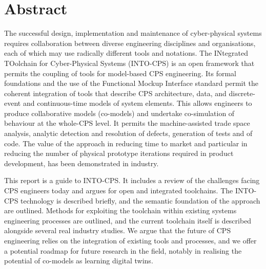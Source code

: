 \documentclass[a4paper,12pt,final]{include/intocpsassociation}   %
\newenvironment{assumption}{\noindent\smallskip\color{blue}\begin{framed}\begin{minipage}{0.95\columnwidth}}{\end{minipage}\end{framed}\smallskip\par}
\begin{document}
\maketitle
%
%
%
\section*{Abstract}
\label{sec:abstract}
%
The successful design, implementation and maintenance of cyber-physical systems requires collaboration between diverse engineering disciplines and organisations, each of which may use radically different tools and notations.
The INtegrated TOolchain for Cyber-Physical Systems (INTO-CPS) is an open framework that permits the coupling of tools for model-based CPS engineering. Its formal foundations and the use of the Functional Mockup Interface standard permit the coherent integration of tools that describe CPS architecture, data, and discrete-event and continuous-time models of system elements. This allows engineers to produce collaborative models (co-models) and undertake co-simulation of behaviour at the whole-CPS level. It permits the machine-assisted trade space analysis, analytic detection and resolution of defects, generation of tests and of code. The value of the approach in reducing time to market and particular in reducing the number of physical prototype iterations required in product development, has been demonstrated in industry.

This report is a guide to INTO-CPS. It includes a review of the challenges facing CPS engineers today and argues for open and integrated toolchains. The INTO-CPS technology is described briefly, and the semantic foundation of the approach are outlined. Methods for exploiting the toolchain within existing systems engineering processes are outlined, and the current toolchain itself is described alongside several real industry studies. We argue that the future of CPS engineering relies on the integration of existing tools and processes, and we offer a potential roadmap for future research in the field, notably in realising the potential of co-models as learning digital twins.
\newpage
%
\tableofcontents
\newpage
%
%
%
%
%
%

\clearpage

\clearpage

\clearpage

\clearpage

\clearpage

\clearpage

\clearpage

\clearpage

\clearpage
%
%
%
%


\label{ch:bib} %
%
%
%
\clearpage
%
%
%
\appendix

\clearpage

\clearpage

%
%
%
\end{document}
